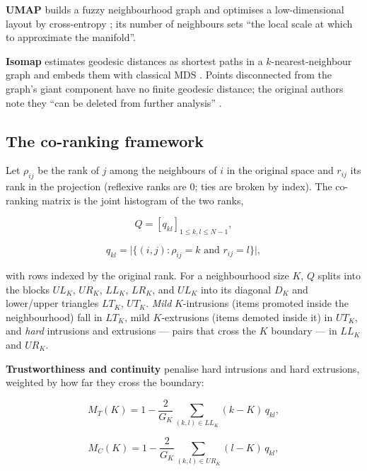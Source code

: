 \documentclass[conference,a4paper]{IEEEtran}
\begin{document}
\textbf{UMAP} builds a fuzzy neighbourhood graph and optimises a
low-dimensional layout by cross-entropy \cite{r9}; its number of
neighbours sets ``the local scale at which to approximate the
manifold''.

\textbf{Isomap} estimates geodesic distances as shortest paths in a
\(k\)-nearest-neighbour graph and embeds them with classical MDS
\cite{r10}. Points disconnected from the graph's giant component have no
finite geodesic distance; the original authors note they ``can be
deleted from further analysis'' \cite[note 19]{r10}.

\subsection{The co-ranking framework}\label{sec:co-ranking-framework}

Let \(\rho_{ij}\) be the rank of \(j\) among the neighbours of \(i\) in
the original space and \(r_{ij}\) its rank in the projection (reflexive
ranks are 0; ties are broken by index). The co-ranking matrix \cite{r1}
is the joint histogram of the two ranks,

\begin{equation}
Q = [q_{kl}]_{1 \le k,l \le N-1},
\end{equation}

\begin{equation}
q_{kl} = \big|\{(i,j) : \rho_{ij}=k \text{ and } r_{ij}=l\}\big|,
\end{equation}

with rows indexed by the original rank. For a neighbourhood size \(K\),
\(Q\) splits into the blocks \(UL_K\), \(UR_K\), \(LL_K\), \(LR_K\), and
\(UL_K\) into its diagonal \(D_K\) and lower/upper triangles \(LT_K\),
\(UT_K\). \emph{Mild} \(K\)-intrusions (items promoted inside the
neighbourhood) fall in \(LT_K\), mild \(K\)-extrusions (items demoted
inside it) in \(UT_K\), and \emph{hard} intrusions and extrusions ---
pairs that cross the \(K\) boundary --- in \(LL_K\) and \(UR_K\).

\textbf{Trustworthiness and continuity} \cite{r11} penalise hard
intrusions and hard extrusions, weighted by how far they cross the
boundary:

\begin{equation}
M_T(K) = 1 - \frac{2}{G_K}\sum_{(k,l)\in LL_K}(k-K)\,q_{kl},
\end{equation}

\begin{equation}
M_C(K) = 1 - \frac{2}{G_K}\sum_{(k,l)\in UR_K}(l-K)\,q_{kl},
\end{equation}
\end{document}

